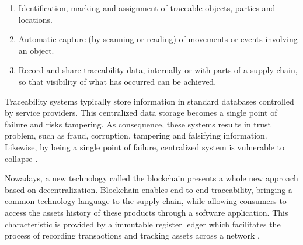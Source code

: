 \begin{enumerate}
\item Identification, marking and assignment of traceable objects, parties and locations.
\item Automatic capture (by scanning or reading) of movements or events involving an object.
\item Record and share traceability data, internally or with parts of a supply chain, so that visibility of what has occurred can be achieved.
\end{enumerate}

Traceability systems typically store information in standard databases controlled by service providers. This centralized data storage becomes a single point of failure and risks tampering. As consequence, these systems results in trust problem, such as fraud, corruption, tampering and falsifying information. Likewise, by being a single point of failure, centralized system is vulnerable to collapse \cite{tian2017supply}.

Nowadays, a new technology called the blockchain presents a whole new approach based on decentralization. Blockchain enables end-to-end traceability, bringing a common technology language to the supply chain, while allowing consumers to access the assets history of these products through a software application. This characteristic is provided by a immutable register ledger which facilitates the process of recording transactions and tracking assets across a network \cite{galvez2018future}.